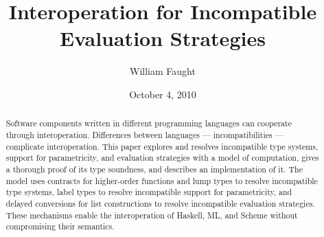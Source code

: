 \documentclass[12pt]{article}
\begin{document}
\title{Interoperation for Incompatible Evaluation Strategies}
\author{William Faught}
\date{October 4, 2010}
\maketitle

\begin{abstract}
Software components written in different programming languages can cooperate through interoperation.  Differences between languages --- incompatibilities --- complicate interoperation.  This paper explores and resolves incompatible type systems, support for parametricity, and evaluation strategies with a model of computation, gives a thorough proof of its type soundness, and describes an implementation of it.  The model uses contracts for higher-order functions and lump types to resolve incompatible type systems, label types to resolve incompatible support for parametricity, and delayed conversions for list constructions to resolve incompatible evaluation strategies.  These mechanisms enable the interoperation of Haskell, ML, and Scheme without compromising their semantics.
\end{abstract}






\clearpage



\end{document}
